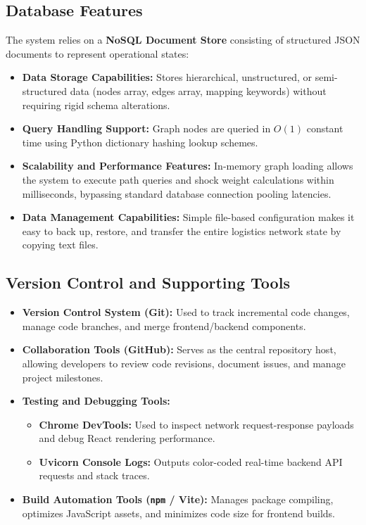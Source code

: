 \subsection[Database Features]{Database Features}

The system relies on a \textbf{NoSQL Document Store} consisting of structured JSON documents to represent operational states:

\begin{itemize}
    \item \textbf{Data Storage Capabilities:} Stores hierarchical, unstructured, or semi-structured data (nodes array, edges array, mapping keywords) without requiring rigid schema alterations.
    \item \textbf{Query Handling Support:} Graph nodes are queried in $O(1)$ constant time using Python dictionary hashing lookup schemes.
    \item \textbf{Scalability and Performance Features:} In-memory graph loading allows the system to execute path queries and shock weight calculations within milliseconds, bypassing standard database connection pooling latencies.
    \item \textbf{Data Management Capabilities:} Simple file-based configuration makes it easy to back up, restore, and transfer the entire logistics network state by copying text files.
\end{itemize}

\subsection[Version Control and Supporting Tools]{Version Control and Supporting Tools}

\begin{itemize}
    \item \textbf{Version Control System (Git):} Used to track incremental code changes, manage code branches, and merge frontend/backend components.
    \item \textbf{Collaboration Tools (GitHub):} Serves as the central repository host, allowing developers to review code revisions, document issues, and manage project milestones.
    \item \textbf{Testing and Debugging Tools:}
    \begin{itemize}
        \item \textbf{Chrome DevTools:} Used to inspect network request-response payloads and debug React rendering performance.
        \item \textbf{Uvicorn Console Logs:} Outputs color-coded real-time backend API requests and stack traces.
    \end{itemize}
    \item \textbf{Build Automation Tools (\texttt{npm} / Vite):} Manages package compiling, optimizes JavaScript assets, and minimizes code size for frontend builds.
\end{itemize}

